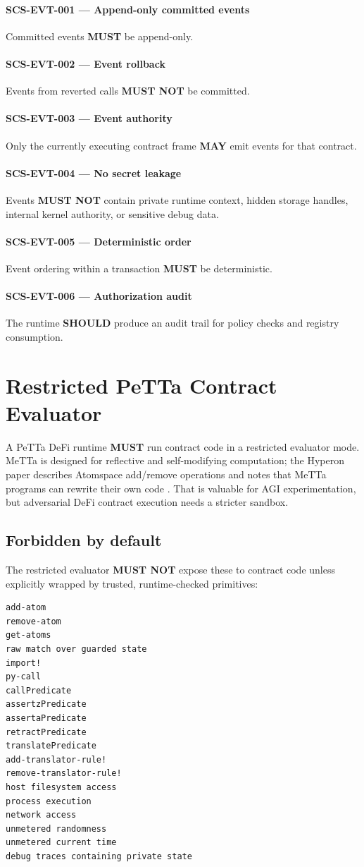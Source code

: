 \documentclass[11pt]{article}
\newcommand{\MeTTa}{MeTTa}
\newcommand{\PeTTa}{PeTTa}
\newcommand{\MUST}{\textbf{MUST}}
\newcommand{\MUSTNOT}{\textbf{MUST NOT}}
\newcommand{\SHOULD}{\textbf{SHOULD}}
\newcommand{\MAY}{\textbf{MAY}}
\newcommand{\req}[2]{\paragraph{#1}#2\par}
\begin{document}
\req{SCS-EVT-001 --- Append-only committed events}{Committed events \MUST{} be append-only.}

\req{SCS-EVT-002 --- Event rollback}{Events from reverted calls \MUSTNOT{} be committed.}

\req{SCS-EVT-003 --- Event authority}{Only the currently executing contract frame \MAY{} emit events for that contract.}

\req{SCS-EVT-004 --- No secret leakage}{Events \MUSTNOT{} contain private runtime context, hidden storage handles, internal kernel authority, or sensitive debug data.}

\req{SCS-EVT-005 --- Deterministic order}{Event ordering within a transaction \MUST{} be deterministic.}

\req{SCS-EVT-006 --- Authorization audit}{The runtime \SHOULD{} produce an audit trail for policy checks and registry consumption.}



\section{Restricted PeTTa Contract Evaluator}

A \PeTTa{} DeFi runtime \MUST{} run contract code in a restricted evaluator mode. \MeTTa{} is designed for reflective and self-modifying computation; the Hyperon paper describes Atomspace add/remove operations and notes that \MeTTa{} programs can rewrite their own code \cite{hyperon-paper}. That is valuable for AGI experimentation, but adversarial DeFi contract execution needs a stricter sandbox.

\subsection{Forbidden by default}

The restricted evaluator \MUSTNOT{} expose these to contract code unless explicitly wrapped by trusted, runtime-checked primitives:

\begin{lstlisting}
add-atom
remove-atom
get-atoms
raw match over guarded state
import!
py-call
callPredicate
assertzPredicate
assertaPredicate
retractPredicate
translatePredicate
add-translator-rule!
remove-translator-rule!
host filesystem access
process execution
network access
unmetered randomness
unmetered current time
debug traces containing private state
\end{lstlisting}
\end{document}
